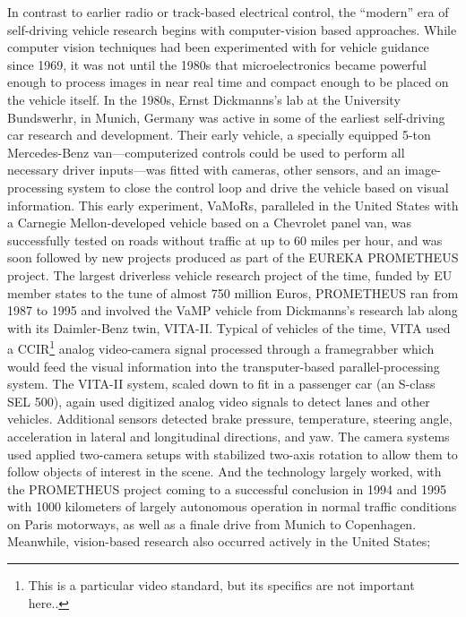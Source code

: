 In contrast to earlier radio or track-based electrical control, the
``modern'' era of self-driving vehicle research begins with
computer-vision based approaches. While computer vision techniques had
been experimented with for vehicle guidance since 1969, it was not
until the 1980s that microelectronics became powerful enough to
process images in near real time and compact enough to be placed on
the vehicle itself\cite{???}. In the 1980s, Ernst Dickmanns's lab at the
University Bundswerhr, in Munich, Germany was active in some of the
earliest self-driving car research and development\cite{???}. Their early
vehicle, a specially equipped 5-ton Mercedes-Benz van---computerized
controls could be used to perform all necessary driver inputs---was
fitted with cameras, other sensors, and an image-processing system to
close the control loop and drive the vehicle based on visual
information.\cite{???} This early experiment, VaMoRs, paralleled in the United
States with a Carnegie Mellon-developed vehicle based on a Chevrolet
panel van, was successfully tested on roads without traffic at up to
60 miles per hour,\cite{???} and was soon followed by new projects produced as
part of the EUREKA PROMETHEUS project\cite{???}. The largest driverless vehicle
research project of the time, funded by EU member states to the tune
of almost 750 million Euros, PROMETHEUS ran from 1987 to 1995 and
involved the VaMP vehicle from Dickmanns's research lab along with its
Daimler-Benz twin, VITA-II. Typical of vehicles of the time, VITA used
a CCIR\footnote{This is a particular video standard, but its specifics are
  not important here..} analog video-camera signal processed through a framegrabber
which would feed the visual information into the transputer-based
parallel-processing system\cite{???}. The VITA-II system, scaled down to fit in
a passenger car (an S-class SEL 500), again used digitized analog
video signals to detect lanes and other vehicles\cite{???}. Additional sensors
detected brake pressure, temperature, steering angle, acceleration in
lateral and longitudinal directions, and yaw\cite{???}. The camera systems used
applied two-camera setups with stabilized two-axis rotation to allow
them to follow objects of interest in the scene\cite{???}. And the
technology largely worked, with the PROMETHEUS project coming to a
successful conclusion in 1994 and 1995 with 1000 kilometers of largely
autonomous operation in normal traffic conditions on Paris motorways,
as well as a finale drive from Munich to Copenhagen\cite{???}.
Meanwhile, vision-based research also occurred actively in the United States;
